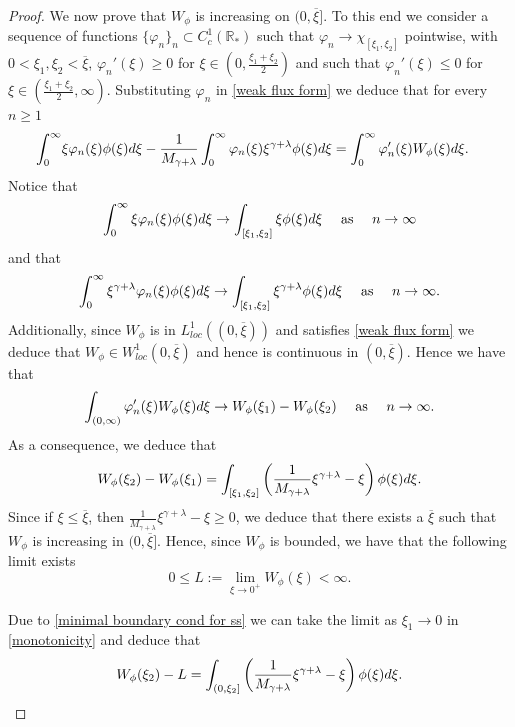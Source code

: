 \documentclass[11pt]{article}
\numberwithin{equation}{section}
\theoremstyle{plain}
\newcommand{\der}{\textup{d}}
\begin{document}
\begin{proof}
We now prove that $ W_\phi$ is increasing on $(0, \overline \xi]$.
To this end we consider a sequence of functions $ \{\varphi_n \}_n \subset C^1_c(\mathbb R_* ) $ such that $\varphi_n \rightarrow \chi_{[\xi_1, \xi_2]} $ pointwise, with $0<\xi_1, \xi_2 < \overline \xi$, $\varphi_n '(\xi) \geq 0 $ for $\xi \in \left(0, \frac{\xi_1+\xi_2}{2}\right)$ and such that $\varphi_n '(\xi) \leq 0 $ for $\xi \in \left( \frac{\xi_1+\xi_2}{2}, \infty\right)$. 
Substituting $\varphi_n$ in \eqref{weak flux form} we deduce that for every $n\geq 1$ 
\begin{align*}
\int_0^\infty&\xi \varphi_n(\xi)\phi(\xi ) \der \xi 	-\frac{1}{M_{\gamma+\lambda}} \int_0^\infty \varphi_n(\xi) \xi^{\gamma+\lambda}\phi(\xi ) \der \xi 
 =\int_0^\infty \varphi_n'(\xi)W_\phi( \xi ) \der \xi. 
\end{align*}
Notice that 
\[
\int_0^\infty \xi \varphi_n(\xi)\phi(\xi ) \der \xi \rightarrow \int_{[\xi_1, \xi_2 ] } \xi \phi(\xi ) \der \xi  \quad \text{ as } \quad n \rightarrow \infty
\] 
and that 
\[
\int_0^\infty \xi^{\gamma+\lambda} \varphi_n(\xi) \phi(\xi ) \der \xi \rightarrow \int_{[\xi_1, \xi_2 ] } \xi^{\gamma+\lambda} \phi(\xi ) \der \xi  \quad \text{ as } \quad n \rightarrow \infty.
\]
Additionally, since $W_\phi$ is in $L^1_{loc}((0, \overline \xi))$ and satisfies \eqref{weak flux form} we deduce that $W_\phi \in W^{1}_{loc}(0, \overline \xi)$ and hence is continuous in $(0, \overline \xi)$. Hence we  have that 
\[
\int_{(0,\infty)}\varphi_n'(\xi)W_\phi( \xi ) \der \xi \rightarrow W_\phi (\xi_1) - W_\phi (\xi_2) \quad \text{ as } \quad n \rightarrow \infty.
\] 
As a consequence, we deduce that 
\begin{align} \label{monotonicity}
W_\phi (\xi_2) - W_\phi (\xi_1) = \int_{[\xi_1, \xi_2] } \left(\frac{1}{M_{\gamma +\lambda} } \xi^{\gamma + \lambda}  - \xi \right) \phi(\xi) \der \xi.
\end{align} 
Since if $\xi \leq \overline \xi $, then 
$\frac{1}{M_{\gamma +\lambda} } \xi^{\gamma + \lambda} - \xi \geq 0$,
we deduce that there exists a $\overline \xi $ such that $W_\phi $ is increasing in $(0, \overline \xi]$. 
Hence, since $W_\phi$ is bounded, we have that the following limit exists
\[
0 \leq L:= \lim_{\xi \rightarrow 0^+} W_\phi (\xi) < \infty.
\]

Due to \eqref{minimal boundary cond for ss} we can take the limit as $\xi_1 \rightarrow 0$ in \eqref{monotonicity} and deduce that 
\begin{align} \label{eq W}
W_\phi (\xi_2) - L  = \int_{(0, \xi_2] } \left(\frac{1}{M_{\gamma +\lambda} } \xi^{\gamma + \lambda} - \xi \right) \phi(\xi) \der \xi. 
\end{align} 


\end{proof}
\end{document}
